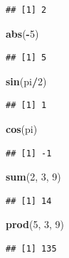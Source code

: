 \documentclass[
]{book}
\newenvironment{Shaded}{\begin{snugshade}}{\end{snugshade}}
\newcommand{\DecValTok}[1]{\textcolor[rgb]{0.00,0.00,0.81}{#1}}
\newcommand{\KeywordTok}[1]{\textcolor[rgb]{0.13,0.29,0.53}{\textbf{#1}}}
\newcommand{\NormalTok}[1]{#1}
\newcommand{\OperatorTok}[1]{\textcolor[rgb]{0.81,0.36,0.00}{\textbf{#1}}}
\begin{document}
\begin{verbatim}
## [1] 2
\end{verbatim}

\begin{Shaded}
\begin{Highlighting}[]
\KeywordTok{abs}\NormalTok{(}\OperatorTok{-}\DecValTok{5}\NormalTok{)}
\end{Highlighting}
\end{Shaded}

\begin{verbatim}
## [1] 5
\end{verbatim}

\begin{Shaded}
\begin{Highlighting}[]
\KeywordTok{sin}\NormalTok{(pi}\OperatorTok{/}\DecValTok{2}\NormalTok{)}
\end{Highlighting}
\end{Shaded}

\begin{verbatim}
## [1] 1
\end{verbatim}

\begin{Shaded}
\begin{Highlighting}[]
\KeywordTok{cos}\NormalTok{(pi)}
\end{Highlighting}
\end{Shaded}

\begin{verbatim}
## [1] -1
\end{verbatim}

\begin{Shaded}
\begin{Highlighting}[]
\KeywordTok{sum}\NormalTok{(}\DecValTok{2}\NormalTok{, }\DecValTok{3}\NormalTok{, }\DecValTok{9}\NormalTok{)}
\end{Highlighting}
\end{Shaded}

\begin{verbatim}
## [1] 14
\end{verbatim}

\begin{Shaded}
\begin{Highlighting}[]
\KeywordTok{prod}\NormalTok{(}\DecValTok{5}\NormalTok{, }\DecValTok{3}\NormalTok{, }\DecValTok{9}\NormalTok{)}
\end{Highlighting}
\end{Shaded}

\begin{verbatim}
## [1] 135
\end{verbatim}
\end{document}
